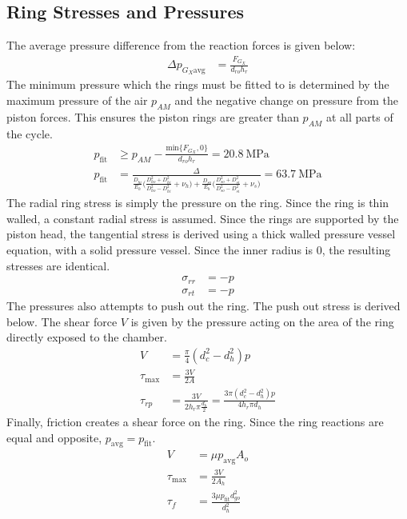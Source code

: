 \documentclass[10pt,a4paper]{article}
\begin{document}
	\subsection*{Ring Stresses and Pressures}
	The average pressure difference from the reaction forces is given below:
	\begin{align}
	 \Delta p_{G_X \text{avg}} &= \frac{F_{G_X}}{d_{ro} h_r}
	\end{align}
	The minimum pressure which the rings must be fitted to is determined by the maximum pressure of the air $p_{AM}$ and the negative change on pressure from the piston forces. This ensures the piston rings are greater than $p_{AM}$ at all parts of the cycle.
	\begin{align}
	p_{\text{fit}} &\geq p_{AM} - \frac{\text{min} \{ F_{G_X}, 0 \}}{d_{ro} h_r} = 20.8\ \text{MPa}\\
	p_{\text{fit}} &= \frac{\Delta}{\frac{D_{hi}}{E_h} \Big( \frac{D_{ho}^2+D_{hi}^2}{D_{ho}^2-D_{hi}^2} + \nu_h \big) +\frac{D_{so}}{E_h} \Big( \frac{D_{so}^2+D_{si}^2}{D_{so}^2-D_{si}^2} + \nu_s \big) } = 63.7\ \text{MPa}
	\end{align}
	The radial ring stress is simply the pressure on the ring. Since the ring is thin walled, a constant radial stress is assumed.
	Since the rings are supported by the piston head, the tangential stress is derived using a thick walled pressure vessel equation, with a solid pressure vessel. Since the inner radius is 0, the resulting stresses are identical.
	\begin{align}
		\sigma_{r r} &= -p\\
		\sigma_{r t} &= -p
	\end{align}
	The pressures also attempts to push out the ring. The push out stress is derived below. The shear force $V$ is given by the pressure acting on the area of the ring directly exposed to the chamber.
	\begin{align}
	 V &= \frac{\pi}{4}(d_{c}^2-d_{h}^2) p\\
	 \tau_{\text{max}} &= \frac{3V}{2A} \\
	 \tau_{rp} &= \frac{3V}{2 h_r \pi \frac{d_h}{2} } = \frac{3 \pi (d_{c}^2-d_{h}^2) p}{4 h_r \pi d_h} 
	\end{align}
	Finally, friction creates a shear force on the ring. Since the ring reactions are equal and opposite, $p_{\text{avg}} = p_{\text{fit}}$.
	\begin{align}
		V &=  \mu p_{\text{avg}} A_o \\
		\tau_{\text{max}} &= \frac{3V}{2A_h} \\
		\tau_{f} &= \frac{3 \mu p_{\text{fit}} d_{go}^2}{d_h^2} 
	\end{align}
\end{document}
